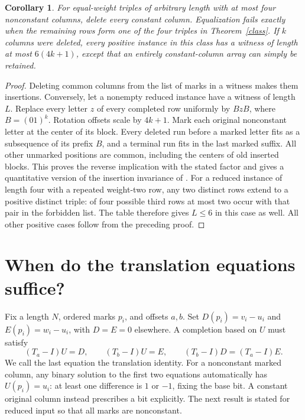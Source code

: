 \documentclass[11pt]{article}
\newtheorem{corollary}[theorem]{Corollary}
\begin{document}
\begin{corollary}\label{core}
For equal-weight triples of arbitrary length with at most four nonconstant columns, delete every constant column. Equalization fails exactly when the remaining rows form one of the four triples in Theorem~\ref{class}. If $k$ columns were deleted, every positive instance in this class has a witness of length at most $6(4k+1)$, except that an entirely constant-column array can simply be retained.
\end{corollary}
\begin{proof}
Deleting common columns from the list of marks in a witness makes them insertions. Conversely, let a nonempty reduced instance have a witness of length $L$. Replace every letter $z$ of every completed row uniformly by $BzB$, where $B=(01)^k$. Rotation offsets scale by $4k+1$. Mark each original nonconstant letter at the center of its block. Every deleted run before a marked letter fits as a subsequence of its prefix $B$, and a terminal run fits in the last marked suffix. All other unmarked positions are common, including the centers of old inserted blocks. This proves the reverse implication with the stated factor and gives a quantitative version of the insertion invariance of \cite[Theorem 3.1]{sn}. For a reduced instance of length four with a repeated weight-two row, any two distinct rows extend to a positive distinct triple: of four possible third rows at most two occur with that pair in the forbidden list. The table therefore gives $L\le6$ in this case as well. All other positive cases follow from the preceding proof.
\end{proof}

\section{When do the translation equations suffice?}
Fix a length $N$, ordered marks $p_i$, and offsets $a,b$. Set $D(p_i)=v_i-u_i$ and $E(p_i)=w_i-u_i$, with $D=E=0$ elsewhere. A completion based on $U$ must satisfy
\begin{equation}\label{grad}
 (T_a-I)U=D,\qquad (T_b-I)U=E,\qquad (T_b-I)D=(T_a-I)E.
\end{equation}
We call the last equation the translation identity. For a nonconstant marked column, any binary solution to the first two equations automatically has $U(p_i)=u_i$: at least one difference is $1$ or $-1$, fixing the base bit. A constant original column instead prescribes a bit explicitly. The next result is stated for reduced input so that all marks are nonconstant.
\end{document}
